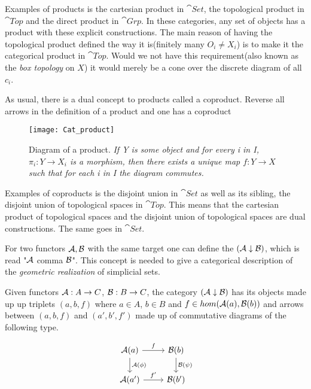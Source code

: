 \documentclass[../../main.tex]{subfiles}
\begin{document}
    Examples of products is the cartesian product in $\cat{Set}$, the topological product in $\cat{Top}$ and the direct product in $\cat{Grp}$. In these categories, any set of objects has a product with these explicit constructions. The main reason of having the topological product defined the way it is(finitely many $O_i \neq X_i$) is to make it the categorical product in $\cat{Top}$. Would we not have this requirement(also known as the \emph{box topology} on $X$) it would merely be a cone over the discrete diagram of all $c_i$.
    
    As usual, there is a dual concept to products called a coproduct. Reverse all arrows in the definition of a product and one has a coproduct
    
    \begin{figure}[H]
        \centering
        \texttt{[image: Cat\_product]}
        \caption{Diagram of a product. \textit{If Y is some object and for every i in I, $\pi_i:Y\to X_i$ is a morphism, then there exists a unique map $f:Y\to X$ such that for each i in I the diagram commutes.}}
        \label{fig:product}
    \end{figure}

    Examples of coproducts is the disjoint union in $\cat{Set}$ as well as its sibling, the disjoint union of topological spaces in $\cat{Top}$. This means that the cartesian product of topological spaces and the disjoint union of topological spaces are dual constructions. The same goes in $\cat{Set}$.

    For two functors $\mathcal{A}, \mathcal{B}$ with the same target one can define the  $(\mathcal{A} \downarrow \mathcal{B})$, which is read "$\mathcal{A}$ comma $\mathcal{B}$". This concept is needed to give a categorical description of the \textit{geometric realization} of simplicial sets.

    \begin{definition}
        Given functors $\mathcal{A}: A \to C$, $\mathcal{B}: B \to C$, the category $(\mathcal{A} \downarrow \mathcal{B})$ has its objects made up up triplets $(a, b, f)$ where $a \in A$, $b \in B$ and $f \in hom(\mathcal{A}(a), \mathcal{B}(b))$ and arrows between $(a, b, f)$ and $(a', b', f')$ made up of commutative diagrams of the following type.
    \end{definition}

    \begin{figure}[H]
        \[
            \begin{tikzcd}
                \functor{A}(a) \arrow[r, "f"] \arrow[d, "\functor{A}(\phi)"]
                & \functor{B}(b) \arrow[d, "\functor{B}(\psi)"] \\
                \functor{A}(a') \arrow[r, "f'"]
                & \functor{B}(b')
            \end{tikzcd}
        \]
    \end{figure}
    
\end{document}
